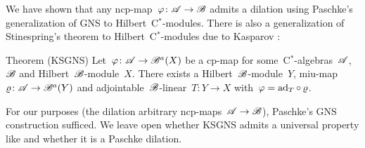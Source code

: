\begin{parsec}[ksgns]%
\begin{point}%
We have shown that any ncp-map~$\varphi\colon \mathscr{A} \to \mathscr{B}$
    admits a dilation using Paschke's generalization of GNS
    to Hilbert~C$^*$-modules.
There is also a generalization of Stinespring's theorem
    to Hilbert~C$^*$-modules
    due to Kasparov \cite{ksgns}:
\end{point}
\begin{point}{Theorem (KSGNS)}%
Let~$\varphi\colon \mathscr{A} \to \mathscr{B}^a(X)$
    be a cp-map
    for some~C$^*$-algebras~$\mathscr{A}$, $\mathscr{B}$
    and Hilbert~$\mathscr{B}$-module~$X$.
There exists a Hilbert~$\mathscr{B}$-module~$Y$,
    miu-map~$\varrho\colon \mathscr{A} \to \mathscr{B}^a(Y)$
    and adjointable~$\mathscr{B}$-linear~$T\colon Y\to X$
    with~$\varphi = \mathrm{ad}_T \mathop{\circ} \varrho$.
\end{point}
\begin{point}%
For our purposes (the dilation arbitrary ncp-maps~$\mathscr{A} \to \mathscr{B}$),
    Paschke's GNS construction sufficed.
We leave open whether
    KSGNS admits a universal property like 
    and whether it is a Paschke dilation.
\end{point}
\end{parsec}
